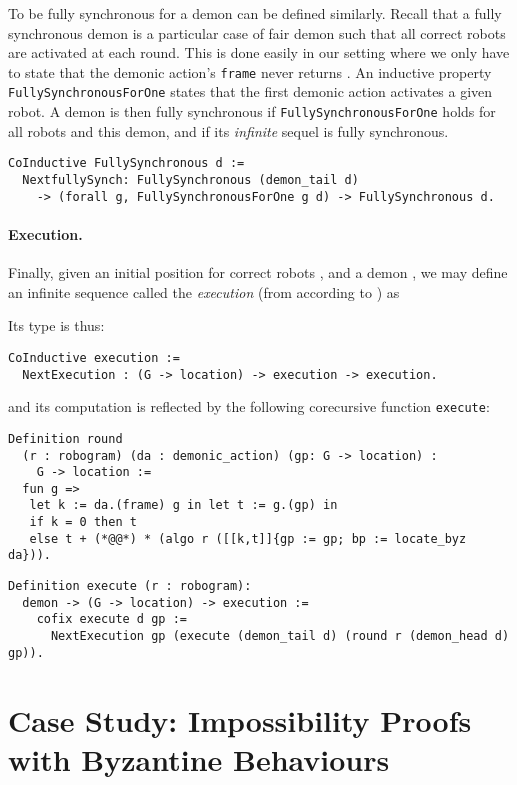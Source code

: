 \documentclass[11pt,a4]{llncs}
\begin{document}
To be fully synchronous\label{page:formal_fsync} for a demon can be defined similarly.  Recall
that a fully synchronous demon is a particular case of fair demon such
that all correct robots are activated at each round. This is done
easily in our setting where we only have to state that the demonic
action's \lstinline!frame! never returns .
An inductive property \lstinline!FullySynchronousForOne! states that
the first demonic action activates a given robot.
A demon is then fully synchronous if
\lstinline!FullySynchronousForOne! holds for all robots and this
demon, and if its \emph{infinite} sequel is fully
synchronous.
\begin{lstlisting}
CoInductive FullySynchronous d :=
  NextfullySynch: FullySynchronous (demon_tail d) 
    -> (forall g, FullySynchronousForOne g d) -> FullySynchronous d.
\end{lstlisting}

\paragraph*{Execution.}\label{sec:execution}
Finally, given an initial position for correct robots , and a demon
      ,
      we may define an infinite sequence  called the \emph{execution} (from 
      according to )
      as
      
Its type is thus: 
\begin{lstlisting}
CoInductive execution := 
  NextExecution : (G -> location) -> execution -> execution.
\end{lstlisting}
and its computation is reflected by the following corecursive function
\lstinline!execute!:
\begin{lstlisting}
Definition round 
  (r : robogram) (da : demonic_action) (gp: G -> location) : 
    G -> location := 
  fun g =>
   let k := da.(frame) g in let t := g.(gp) in
   if k = 0 then t 
   else t + (*@@*) * (algo r ([[k,t]]{gp := gp; bp := locate_byz da})).

\end{lstlisting}
\begin{lstlisting}
Definition execute (r : robogram): 
  demon -> (G -> location) -> execution :=
    cofix execute d gp :=
      NextExecution gp (execute (demon_tail d) (round r (demon_head d) gp)).
\end{lstlisting}


\section{Case Study: Impossibility Proofs with Byzantine Behaviours}
\label{sec:some-proofs}
\end{document}
